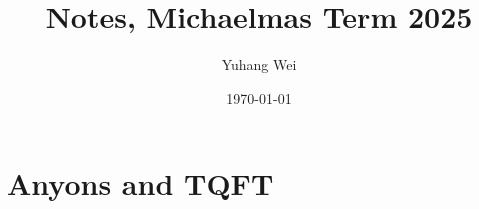 \documentclass[11pt,a4paper]{book}
\theoremstyle{plain} %
\theoremstyle{definition} %
\theoremstyle{claimstyle}
\begin{document}
\title{Notes, Michaelmas Term 2025}
\author{Yuhang Wei}
\date{\today}
\maketitle
\tableofcontents


\chapter{Anyons and TQFT}



\newpage
\printbibliography
\end{document}
